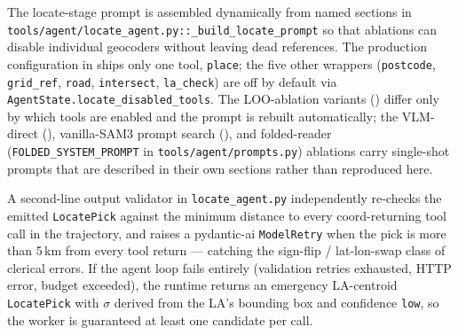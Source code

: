 \documentclass[11pt]{article}
\begin{document}
The locate-stage prompt is assembled dynamically from named sections in \texttt{tools/agent/locate\_agent.py::\_build\_locate\_prompt} so that ablations can disable individual geocoders without leaving dead references. The production configuration in  ships only one tool, \texttt{place}; the five other wrappers (\texttt{postcode}, \texttt{grid\_ref}, \texttt{road}, \texttt{intersect}, \texttt{la\_check}) are off by default via \texttt{AgentState.locate\_disabled\_tools}. The LOO-ablation variants () differ only by which tools are enabled and the prompt is rebuilt automatically; the VLM-direct (), vanilla-SAM3 prompt search (), and folded-reader (\texttt{FOLDED\_SYSTEM\_PROMPT} in \texttt{tools/agent/prompts.py}) ablations carry single-shot prompts that are described in their own sections rather than reproduced here.

A second-line output validator in \texttt{locate\_agent.py} independently re-checks the emitted \texttt{LocatePick} against the minimum distance to every coord-returning tool call in the trajectory, and raises a pydantic-ai \texttt{ModelRetry} when the pick is more than 5\,km from every tool return --- catching the sign-flip / lat-lon-swap class of clerical errors. If the agent loop fails entirely (validation retries exhausted, HTTP error, budget exceeded), the runtime returns an emergency LA-centroid \texttt{LocatePick} with $\sigma$ derived from the LA's bounding box and confidence \texttt{low}, so the worker is guaranteed at least one candidate per call.
\end{document}
